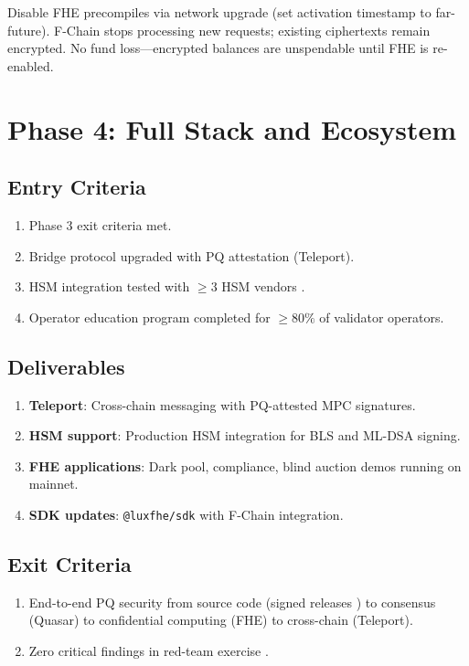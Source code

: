 \documentclass[11pt]{article}
\begin{document}
Disable FHE precompiles via network upgrade (set activation timestamp to far-future). F-Chain stops processing new requests; existing ciphertexts remain encrypted. No fund loss---encrypted balances are unspendable until FHE is re-enabled.

\section{Phase 4: Full Stack and Ecosystem}

\subsection{Entry Criteria}

\begin{enumerate}
\item Phase 3 exit criteria met.
\item Bridge protocol upgraded with PQ attestation (Teleport).
\item HSM integration tested with $\geq 3$ HSM vendors \cite{hsm-boundary}.
\item Operator education program completed for $\geq 80\%$ of validator operators.
\end{enumerate}

\subsection{Deliverables}

\begin{enumerate}
\item \textbf{Teleport}: Cross-chain messaging with PQ-attested MPC signatures.
\item \textbf{HSM support}: Production HSM integration for BLS and ML-DSA signing.
\item \textbf{FHE applications}: Dark pool, compliance, blind auction demos running on mainnet.
\item \textbf{SDK updates}: \texttt{@luxfhe/sdk} with F-Chain integration.
\end{enumerate}

\subsection{Exit Criteria}

\begin{enumerate}
\item End-to-end PQ security from source code (signed releases \cite{reproducible-builds}) to consensus (Quasar) to confidential computing (FHE) to cross-chain (Teleport).
\item Zero critical findings in red-team exercise \cite{proof-methodology}.
\end{enumerate}
\end{document}
